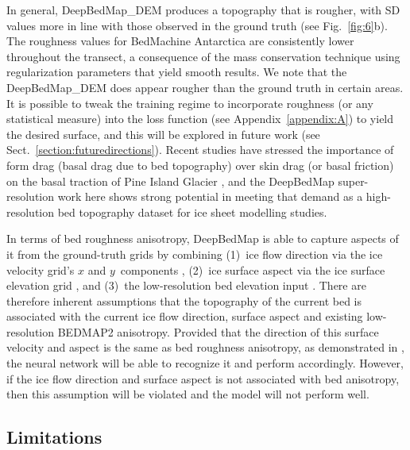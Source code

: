 \documentclass[tc, noline]{copernicus}
\begin{document}
In general, DeepBedMap\_DEM produces a topography that is rougher, with SD values more in line with those observed in the ground truth (see
Fig.~\ref{fig:6}b). The roughness values for BedMachine Antarctica are consistently lower throughout the transect, a consequence of the mass
conservation technique using regularization parameters that yield smooth results. We note that the DeepBedMap\_DEM does appear rougher than the
ground truth in certain areas. It is possible to tweak the training regime to incorporate roughness (or any statistical measure) into the loss function
(see Appendix~\ref{appendix:A}) to yield the desired surface, and this will be explored in future work (see
Sect.~\ref{section:futuredirections}). Recent studies have stressed the importance of form drag (basal drag due to bed topography) over skin drag (or
basal friction) on the basal traction of Pine Island Glacier \citep{BinghamDiverselandscapesPine2017,Kyrke-SmithRelevanceDetailBasal2018}, and the
DeepBedMap super-resolution work here shows strong potential in meeting that demand as a high-resolution bed topography dataset for ice sheet
modelling studies.

In terms of bed roughness anisotropy, DeepBedMap is able to capture aspects of it from the ground-truth grids by combining (1)~ice flow direction via
the ice velocity grid's $x$ and $y$~components \citep{MouginotMEaSUREsPhaseMap2019}, (2)~ice surface aspect via the ice surface elevation grid
\citep{HowatReferenceElevationModel2019}, and (3)~the low-resolution bed elevation input \citep{FretwellBedmap2improvedice2013}. There are therefore
inherent assumptions that the topography of the current bed is associated with the current ice flow direction, surface aspect and existing low-resolution BEDMAP2 anisotropy. Provided that the direction of this surface velocity and aspect is the same as bed roughness anisotropy, as
demonstrated in \citet{HolschuhLinkingpostglaciallandscapes2020}, the neural network will be able to recognize it and perform accordingly. However, if
the ice flow direction and surface aspect is not associated with bed anisotropy, then this assumption will be violated and the model will not perform
well.


\subsection{Limitations}
\end{document}
